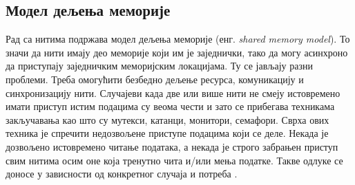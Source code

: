 \documentclass[12pt,oneside]{memoir}
\begin{document}
\subsection{Модел дељења меморије}
Рад са нитима подржава модел дељења меморије (енг. \textit{shared memory model}). То значи да нити имају део меморије који им је заједнички, тако да могу асинхроно да приступају заједничким меморијским локацијама. Ту се јављају разни проблеми. Треба омогућити безбедно дељење ресурса, комуникацију и синхронизацију нити.  Случајеви када две или више нити не смеју истовремено имати приступ истим подацима су веома чести и зато се прибегава техникама закључавања као што су мутекси, катанци, монитори, семафори. Сврха ових техника је спречити недозвољене приступе подацима који се деле. Некада је дозвољено истовремено читање података, а некада је строго забрањен приступ свим нитима осим оне која тренутно чита и/или мења податке. Такве одлуке се доносе у зависности од конкретног случаја и потреба \cite{progInScala3, survey}.
\end{document}
